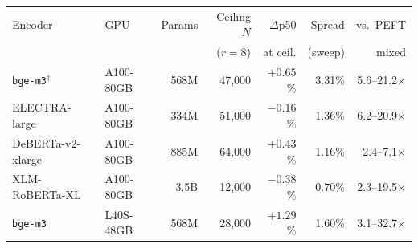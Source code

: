 \begin{tabular}{@{}llrrrrr@{}}
\toprule
Encoder & GPU & Params & Ceiling $N$ & $\Delta$p50 & Spread & vs.\ PEFT \\
 & & & ($r{=}8$) & at ceil. & (sweep) & mixed \\
\midrule
\texttt{bge-m3}$^{\dagger}$ & A100-80GB & 568M & 47{,}000 & $+0.65$\% & 3.31\% & 5.6--21.2$\times$ \\
ELECTRA-large & A100-80GB & 334M & 51{,}000 & $-0.16$\% & 1.36\% & 6.2--20.9$\times$ \\
DeBERTa-v2-xlarge & A100-80GB & 885M & 64{,}000 & $+0.43$\% & 1.16\% & 2.4--7.1$\times$ \\
XLM-RoBERTa-XL & A100-80GB & 3.5B & 12{,}000 & $-0.38$\% & 0.70\% & 2.3--19.5$\times$ \\
\texttt{bge-m3} & L40S-48GB & 568M & 28{,}000 & $+1.29$\% & 1.60\% & 3.1--32.7$\times$ \\
\bottomrule
\end{tabular}
